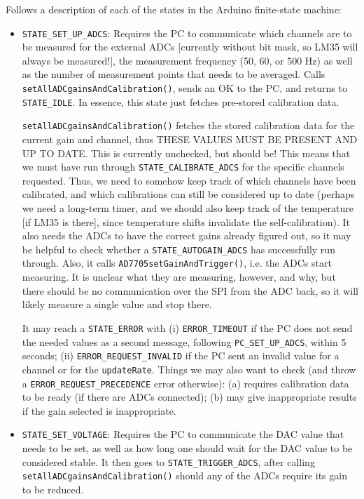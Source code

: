 \documentclass[11pt,a4paper,english]{article}
\begin{document}
\vspace*{\baselineskip}
\noindent{}Follows a description of each of the states in the Arduino finite-state machine:
\begin{itemize}
\item \texttt{STATE\_SET\_UP\_ADCS}: Requires the PC to communicate which channels are to be measured for the external ADCs [currently without bit mask, so LM35 will always be measured!], the measurement frequency (50, 60, or 500 Hz) as well as the number of measurement points that needs to be averaged. Calls \texttt{setAllADCgainsAndCalibration()}, sends an OK to the PC, and returns to \texttt{STATE\_IDLE}. In essence, this state just fetches pre-stored calibration data.

	\texttt{setAllADCgainsAndCalibration()} fetches the stored calibration data for the current gain and channel, thus THESE VALUES MUST BE PRESENT AND UP TO DATE. This is currently unchecked, but should be! This means that we must have run through \texttt{STATE\_CALIBRATE\_ADCS} for the specific channels requested. Thus, we need to somehow keep track of which channels have been calibrated, and which calibrations can still be considered up to date (perhaps we need a long-term timer, and we should also keep track of the temperature [if LM35 is there], since temperature shifts invalidate the self-calibration). It also needs the ADCs to have the correct gains already figured out, so it may be helpful to check whether a \texttt{STATE\_AUTOGAIN\_ADCS} has successfully run through. Also, it calls \texttt{AD7705setGainAndTrigger()}, i.e. the ADCs start measuring. It is unclear what they are measuring, however, and why, but there should be no communication over the SPI from the ADC back, so it will likely measure a single value and stop there.

	It may reach a \texttt{STATE\_ERROR} with (i) \texttt{ERROR\_TIMEOUT} if the PC does not send the needed values as a second message, following \texttt{PC\_SET\_UP\_ADCS}, within 5 seconds; (ii) \texttt{ERROR\_REQUEST\_INVALID} if the PC sent an invalid value for a channel or for the \texttt{updateRate}. Things we may also want to check (and throw a \texttt{ERROR\_REQUEST\_PRECEDENCE} error otherwise): (a) requires calibration data to be ready (if there are ADCs connected); (b) may give inappropriate results if the gain selected is inappropriate.

\item \texttt{STATE\_SET\_VOLTAGE}: Requires the PC to communicate the DAC value that needs to be set, as well as how long one should wait for the DAC value to be considered stable. It then goes to \texttt{STATE\_TRIGGER\_ADCS}, after calling \texttt{setAllADCgainsAndCalibration()} should any of the ADCs require its gain to be reduced.
	

\end{itemize}
\end{document}
